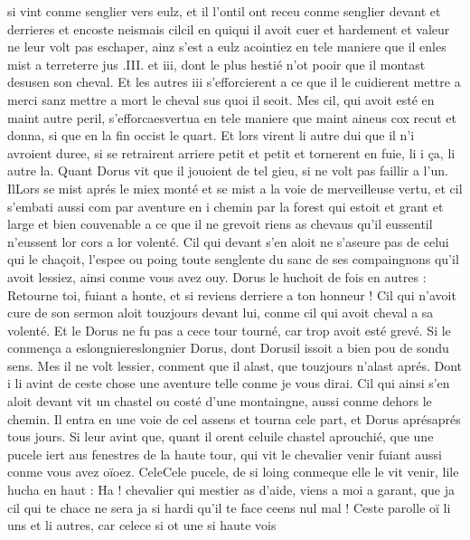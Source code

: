\documentclass{article}
\begin{document}
\begin{pages}
   si vint conme senglier vers eulz, et il l'ontil ont receu 
   conme senglier devant et derrieres et encoste 
   neismais cilcil en 
   quiqui il avoit cuer et hardement et valeur ne leur volt pas eschaper, 
   ainz s’est a eulz acointiez en tele maniere que il enles mist 
   a terreterre jus .III. et iii, dont le plus hestié n’ot pooir 
   que il montast desusen son cheval. Et les autres iii 
   s’efforcierent a ce que il le cuidierent mettre a merci sanz mettre a mort le cheval sus quoi il seoit. Mes cil, qui avoit esté en 
   maint autre peril, s’efforcaesvertua en tele maniere que maint aineus cox 
   recut et donna, si que en la fin occist le quart. Et lors virent li autre dui que il n’i avroient duree, si se retrairent 
   arriere petit et petit et tornerent en fuie, li i ça, li autre la. \pend
\pstart Quant Dorus vit que il jouoient de tel gieu, 
   si ne volt pas faillir a l’un. IlLors se mist aprés 
   le miex monté 
   et se mist a la voie de merveilleuse vertu, et cil s’embati aussi com par aventure en i chemin par la forest qui estoit et 
   grant et large et bien couvenable a ce que il ne grevoit riens as chevaus 
   qu’il eussentil n'eussent lor cors a lor volenté. 
   Cil qui devant s’en aloit ne s’aseure pas de 
   celui qui le chaçoit, l’espee ou poing toute senglente du sanc de ses compaingnons qu’il avoit 
   lessiez, ainsi conme vous avez ouy. 
   Dorus le huchoit de fois en autres :
   Retourne toi, fuiant a honte, et si reviens derriere 
      a ton honneur !
   Cil qui n’avoit cure de son sermon aloit touzjours devant lui, 
   conme cil qui avoit cheval a sa volenté. Et le Dorus ne fu pas a 
      cece tour tourné, car trop avoit 
      esté grevé. Si le conmença a eslongniereslongnier Dorus, 
   dont Dorusil issoit a bien pou 
   de sondu sens. Mes il ne volt lessier, conment que il alast, que touzjours 
   n’alast aprés. Dont i li avint de ceste chose une aventure 
   telle conme je vous dirai. Cil qui ainsi s’en aloit devant 
   vit un chastel ou costé d’une montaingne, aussi conme dehors le chemin. Il entra en une voie 
   de cel assens et tourna cele part, et Dorus 
   aprésaprés tous jours. 
   Si leur avint que, quant il orent celuile 
   chastel aprouchié, que 
   une pucele iert aus fenestres de la haute tour, 
   qui vit le chevalier venir fuiant aussi conme vous 
      avez oïoez. 
   CeleCele pucele, 
   de si loing conmeque 
   elle le vit venir, 
      lile hucha en haut :
   Ha ! chevalier qui mestier as d’aide, viens a moi a garant, 
      que ja cil qui te chace ne sera ja si hardi qu’il te face ceens nul mal !
   Ceste parolle oï li uns et li autres, car celece si ot une si haute vois 

\end{pages}
\end{document}
